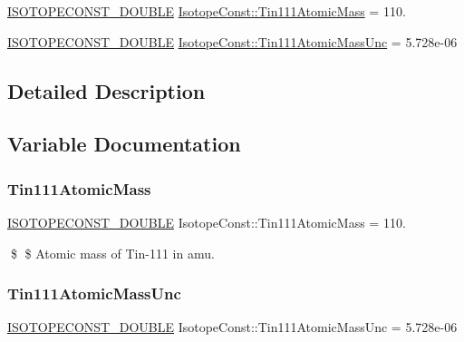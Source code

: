 \begin{DoxyCompactItemize}
\item 
\mbox{\hyperlink{group___isotope_const-_macros_ga8f45a7272ce02c0b4c65c44636ed719a}{I\+S\+O\+T\+O\+P\+E\+C\+O\+N\+S\+T\+\_\+\+D\+O\+U\+B\+LE}} \mbox{\hyperlink{group___isotope_const-_tin-_sn111_ga07008a39339ae91fb5f573c8b2d25cac}{Isotope\+Const\+::\+Tin111\+Atomic\+Mass}} = 110.
\item 
\mbox{\hyperlink{group___isotope_const-_macros_ga8f45a7272ce02c0b4c65c44636ed719a}{I\+S\+O\+T\+O\+P\+E\+C\+O\+N\+S\+T\+\_\+\+D\+O\+U\+B\+LE}} \mbox{\hyperlink{group___isotope_const-_tin-_sn111_gac6db59e011fb881a783a7dd640e4c97a}{Isotope\+Const\+::\+Tin111\+Atomic\+Mass\+Unc}} = 5.\+728e-\/06
\end{DoxyCompactItemize}


\subsection{Detailed Description}


\subsection{Variable Documentation}
\mbox{\label{group___isotope_const-_tin-_sn111_ga07008a39339ae91fb5f573c8b2d25cac}} 
\subsubsection{\texorpdfstring{Tin111\+Atomic\+Mass}{Tin111AtomicMass}}
{\footnotesize\ttfamily \mbox{\hyperlink{group___isotope_const-_macros_ga8f45a7272ce02c0b4c65c44636ed719a}{I\+S\+O\+T\+O\+P\+E\+C\+O\+N\+S\+T\+\_\+\+D\+O\+U\+B\+LE}} Isotope\+Const\+::\+Tin111\+Atomic\+Mass = 110.}

\$ \$ Atomic mass of Tin-\/111 in amu. \mbox{\label{group___isotope_const-_tin-_sn111_gac6db59e011fb881a783a7dd640e4c97a}} 
\subsubsection{\texorpdfstring{Tin111\+Atomic\+Mass\+Unc}{Tin111AtomicMassUnc}}
{\footnotesize\ttfamily \mbox{\hyperlink{group___isotope_const-_macros_ga8f45a7272ce02c0b4c65c44636ed719a}{I\+S\+O\+T\+O\+P\+E\+C\+O\+N\+S\+T\+\_\+\+D\+O\+U\+B\+LE}} Isotope\+Const\+::\+Tin111\+Atomic\+Mass\+Unc = 5.\+728e-\/06}


